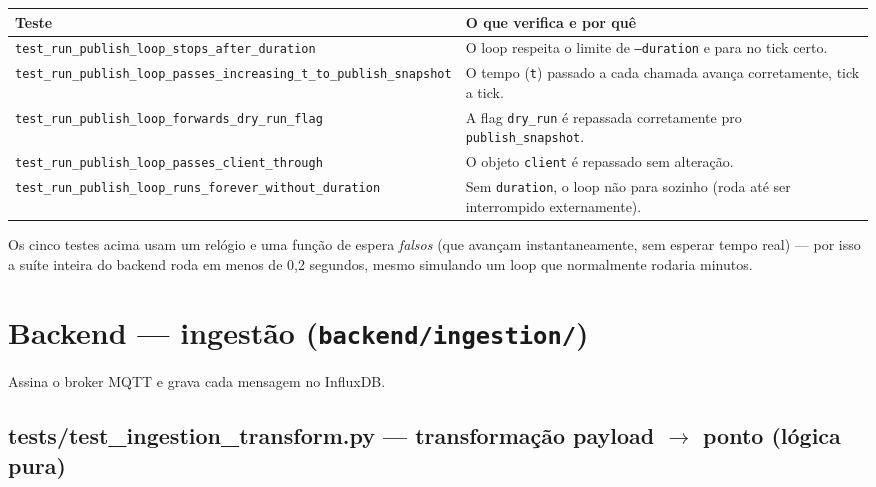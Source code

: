 \documentclass[10pt,a4paper]{article}
\begin{document}
\begin{center}
\begin{longtable}{L{5cm}L{9.5cm}}
\toprule
\textbf{Teste} & \textbf{O que verifica e por quê} \\
\midrule
\endhead
\texttt{test\_\allowbreak run\_\allowbreak publish\_\allowbreak loop\_\allowbreak stops\_\allowbreak after\_\allowbreak duration} & O loop respeita o limite de \texttt{--duration} e para no tick certo. \\
\texttt{test\_\allowbreak run\_\allowbreak publish\_\allowbreak loop\_\allowbreak passes\_\allowbreak increasing\_\allowbreak t\_\allowbreak to\_\allowbreak publish\_\allowbreak snapshot} & O tempo (\texttt{t}) passado a cada chamada avança corretamente, tick a tick. \\
\texttt{test\_\allowbreak run\_\allowbreak publish\_\allowbreak loop\_\allowbreak forwards\_\allowbreak dry\_\allowbreak run\_\allowbreak flag} & A flag \texttt{dry\_\allowbreak run} é repassada corretamente pro \texttt{publish\_\allowbreak snapshot}. \\
\texttt{test\_\allowbreak run\_\allowbreak publish\_\allowbreak loop\_\allowbreak passes\_\allowbreak client\_\allowbreak through} & O objeto \texttt{client} é repassado sem alteração. \\
\texttt{test\_\allowbreak run\_\allowbreak publish\_\allowbreak loop\_\allowbreak runs\_\allowbreak forever\_\allowbreak without\_\allowbreak duration} & Sem \texttt{duration}, o loop não para sozinho (roda até ser interrompido externamente). \\
\bottomrule
\end{longtable}
\end{center}

Os cinco testes acima usam um relógio e uma função de espera \textit{falsos} (que avançam instantaneamente, sem esperar tempo real) — por isso a suíte inteira do backend roda em menos de 0,2 segundos, mesmo simulando um loop que normalmente rodaria minutos.

\section{Backend --- ingestão (\texttt{backend/ingestion/})}

Assina o broker MQTT e grava cada mensagem no InfluxDB.

\subsection{tests/test\_\allowbreak ingestion\_\allowbreak transform.py --- transformação payload $\to$ ponto (lógica pura)}
\end{document}
